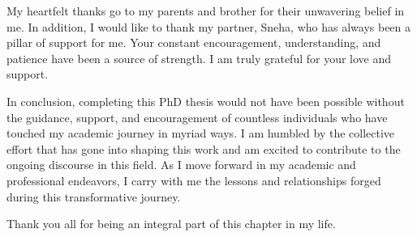My heartfelt thanks go to my parents and brother for their unwavering belief in me. In addition, I would like to thank my partner, Sneha, who has always been a pillar of support for me. Your constant encouragement, understanding, and patience have been a source of strength. I am truly grateful for your love and support.

In conclusion, completing this PhD thesis would not have been possible without the guidance, support, and encouragement of countless individuals who have touched my academic journey in myriad ways. I am humbled by the collective effort that has gone into shaping this work and am excited to contribute to the ongoing discourse in this field. As I move forward in my academic and professional endeavors, I carry with me the lessons and relationships forged during this transformative journey.

Thank you all for being an integral part of this chapter in my life.